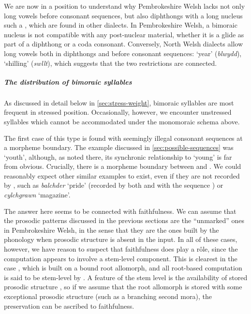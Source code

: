 We are now in a position to understand why Pembrokeshire Welsh lacks not only long vowels before consonant sequences, but also diphthongs with a long nucleus such a \ipa{[aːi]}, which are found in other dialects. In Pembrokeshire Welsh, a bimoraic nucleus is not compatible with any post-nuclear material, whether it is a glide as part of a diphthong or a coda consonant. Conversely, North Welsh dialects allow long vowels both in diphthongs and before consonant sequences: \ipa{[ˈblʊːɨð]} `year' (\emph{blwydd}), \ipa{[ˈsuːɬt]} `shilling' (\emph{swllt}), which suggests that the two restrictions are connected.

\subparagraph{The distribution of bimoraic syllables}
\label{sec:distr-bimor-syll}

As discussed in detail below in \cref{sec:stress-weight}, bimoraic syllables are most frequent in stressed position. Occasionally, however, we encounter unstressed syllables which cannot be accommodated under the monomoraic schema above.

The first case of this type is found with seemingly illegal consonant sequences at a morpheme boundary. The example discussed in \cref{sec:possible-sequences} was \ipa{[ˈjeŋktid]} `youth', although, as noted there, its synchronic relationship to \ipa{[ˈiːvaŋk]} `young' is far from obvious. Crucially, there is a morpheme boundary between \ipa{[k]} and \ipa{[t]}. We could reasonably expect other similar examples to exist, even if they are not recorded by \citet{awbery86:_pembr_welsh}, such as \emph{balchder} `pride' (recorded by both \citealt{fynes-clinton} and \citealt{thomas93:_tafod_nantg} with the sequence \ipa{[lχt]}) or \emph{cylchgrawn} `magazine'.

The answer here seems to be connected with faithfulness. We can assume that the prosodic patterns discussed in the previous sections are the \enquote{unmarked} ones in Pembrokeshire Welsh, in the sense that they are the ones built by the phonology when prosodic structure is absent in the input. In all of these cases, however, we have reason to suspect that faithfulness does play a rôle, since the computation appears to involve a stem\hyp level component. This is clearest in the case \ipa{[ˈjeŋktid]}, which is built on a bound root allomorph, and all root\hyp based computation is said to be stem\hyp level by \citet{bermudez-oterong}. A feature of the stem level is the availability of stored prosodic structure \citep{botero-mcmahon,collie07:_englis_strat_optim_theor,bermudez-oterong}, so if we assume that the root allomorph  is stored with some exceptional prosodic structure (such as a branching second mora), the preservation can be ascribed to faithfulness.

